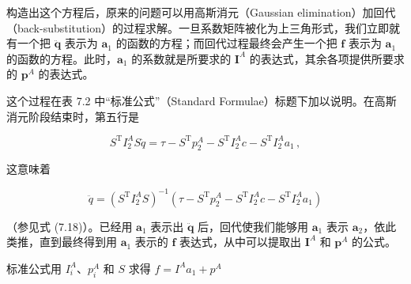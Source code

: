 \documentclass[10pt,a4paper]{book}
\theoremstyle{thmstyle} %
\theoremstyle{defstyle} %
\theoremstyle{prostyle} %
\begin{document}
构造出这个方程后，原来的问题可以用高斯消元（Gaussian elimination）加回代（back-substitution）的过程求解。一旦系数矩阵被化为上三角形式，我们立即就有一个把 $\ddot{\boldsymbol{q}}$ 表示为 $\boldsymbol{a}_{1}$ 的函数的方程；而回代过程最终会产生一个把 $\boldsymbol{f}$ 表示为 $\boldsymbol{a}_{1}$ 的函数的方程。此时，$\boldsymbol{a}_{1}$ 的系数就是所要求的 $\boldsymbol{I}^{A}$ 的表达式，其余各项提供所要求的 $\boldsymbol{p}^{A}$ 的表达式。



这个过程在表 7.2 中“标准公式”（Standard Formulae）标题下加以说明。在高斯消元阶段结束时，第五行是



$$
S ^{\mathrm { T} } I _ { 2 } ^{A} S \ddot { q } = \tau - S ^{\mathrm { T} } p _ { 2 } ^{A} - S ^{\mathrm { T} } I _ { 2 } ^{A} c - S ^{\mathrm { T} } I _ { 2 } ^{A} a _ { 1 } \, ,
$$



这意味着



$$
\ddot { q } = ( S ^{\mathrm { T} } I _ { 2 } ^{A} S ) ^{- 1} ( \tau - S ^{\mathrm { T} } p _ { 2 } ^{A} - S ^{\mathrm { T} } I _ { 2 } ^{A} c - S ^{\mathrm { T} } I _ { 2 } ^{A} a _ { 1 } )
$$



（参见式 (7.18)）。已经用 $\boldsymbol{a}_{1}$ 表示出 $\ddot{\boldsymbol{q}}$ 后，回代使我们能够用 $\boldsymbol{a}_{1}$ 表示 $\boldsymbol{a}_{2}$，依此类推，直到最终得到用 $\boldsymbol{a}_{1}$ 表示的 $\boldsymbol{f}$ 表达式，从中可以提取出 $\boldsymbol{I}^{A}$ 和 $\boldsymbol{p}^{A}$ 的公式。



标准公式用 $I_{i}^{A}$、$p_{i}^{A}$ 和 $S$ 求得 $f=I^{A}a_{1}+p^{A}$
\end{document}
